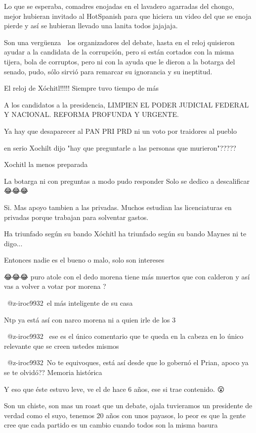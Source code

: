 Lo que se esperaba, comadres enojadas en el lavadero agarradas del chongo, mejor hubieran invitado al HotSpanish para que hiciera un video del que se enoja pierde y así se hubieran llevado una lanita todos jajajaja.

Son una vergüenza 🤬 los organizadores del debate, hasta en el reloj quisieron ayudar a la candidata de la corrupción, pero si están cortados con la misma tijera, bola de corruptos, pero ni con la ayuda que le dieron a la botarga del senado, pudo, sólo sirvió para remarcar su ignorancia y su ineptitud.

El reloj de Xóchitl!!!!! Siempre tuvo tiempo de más

A los candidatos a la presidencia, LIMPIEN EL PODER JUDICIAL FEDERAL Y NACIONAL. REFORMA PROFUNDA Y URGENTE.

Ya hay que desaparecer al PAN PRI PRD ni un voto por traidores al pueblo

en serio Xochilt dijo "hay que preguntarle a las personas que murieron"?????

Xochitl la menos preparada

La botarga ni con preguntas a modo pudo responder 
Solo se dedico a descalificar  😂😂😂

Si. Mas apoyo tambien a las privadas. Muchos estudian las licenciaturas en privadas porque trabajan para solventar gastos.

Ha triunfado según su bando
Xóchitl ha triunfado según su bando 
Maynes ni te digo...

Entonces nadie es el bueno o malo, solo son intereses 😶‍🌫️

😂😂😂 puro atole con el dedo morena tiene más muertos que con calderon y así vas a volver a votar por morena ? 🤡

​ @z-iroc9932 el más inteligente de su casa

Ntp ya está así con narco morena ni a quien irle de los 3

​ @z-iroc9932  ese es el único comentario que te queda en la cabeza en lo único relevante que se creen ustedes mismos

​​ @z-iroc9932 No te equivoques, está así desde que lo gobernó el Prian, apoco ya se te olvidó?? Memoria histórica

Y eso que éste estuvo leve, ve el de hace 6 años, ese si trae contenido. 😮

Son un chiste, son mas un roast que un debate, ojala tuvieramos un presidente de verdad como el suyo, tenemos 20 años con unos payasos, lo peor es que la gente cree que cada partido es un cambio cuando todos son la misma basura

